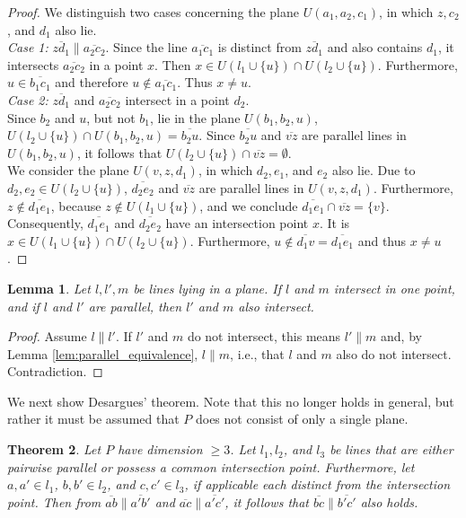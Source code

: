 \documentclass[11pt,a4paper]{article}
\newcommand{\lineab}[1]{\overline{#1}}
\newtheorem{theorem}{Theorem}[section]
\newtheorem{lemma}[theorem]{Lemma}
\begin{document}
\begin{proof}
We distinguish two cases concerning the plane $U(a_1, a_2, c_1)$, in which $z, c_2$, and $d_1$ also lie. \\
\textit{Case 1:} $\lineab{z d_1} \parallel \lineab{a_2 c_2}$. Since the line $\lineab{a_1 c_1}$ is distinct from $\lineab{z d_1}$ and also contains $d_1$, it intersects $\lineab{a_2 c_2}$ in a point $x$. Then $x \in U(l_1 \cup \{u\}) \cap U(l_2 \cup \{u\})$. Furthermore, $u \in \lineab{b_1 c_1}$ and therefore $u \notin \lineab{a_1 c_1}$. Thus $x \neq u$. \\
\textit{Case 2:} $\lineab{z d_1}$ and $\lineab{a_2 c_2}$ intersect in a point $d_2$. \\
Since $b_2$ and $u$, but not $b_1$, lie in the plane $U(b_1, b_2, u)$, $U(l_2 \cup \{u\}) \cap U(b_1, b_2, u) = \lineab{b_2 u}$. Since $\lineab{b_2 u}$ and $\lineab{v z}$ are parallel lines in $U(b_1, b_2, u)$, it follows that $U(l_2 \cup \{u\}) \cap \lineab{v z} = \emptyset$. \\
We consider the plane $U(v, z, d_1)$, in which $d_2, e_1$, and $e_2$ also lie. Due to $d_2, e_2 \in U(l_2 \cup \{u\})$, $\lineab{d_2 e_2}$ and $\lineab{v z}$ are parallel lines in $U(v, z, d_1)$. Furthermore, $z \notin \lineab{d_1 e_1}$, because $z \notin U(l_1 \cup \{u\})$, and we conclude $\lineab{d_1 e_1} \cap \lineab{v z} = \{v\}$. Consequently, $\lineab{d_1 e_1}$ and $\lineab{d_2 e_2}$ have an intersection point $x$. It is $x \in U(l_1 \cup \{u\}) \cap U(l_2 \cup \{u\})$. Furthermore, $u \notin \lineab{d_1 v} = \lineab{d_1 e_1}$ and thus $x \neq u$.
\end{proof}

\begin{lemma} \label{lem:parallel_intersection_transfer}
Let $l, l', m$ be lines lying in a plane. If $l$ and $m$ intersect in one point, and if $l$ and $l'$ are parallel, then $l'$ and $m$ also intersect.
\end{lemma}
\begin{proof}
Assume $l \parallel l'$. If $l'$ and $m$ do not intersect, this means $l' \parallel m$ and, by Lemma \ref{lem:parallel_equivalence}, $l \parallel m$, i.e., that $l$ and $m$ also do not intersect. Contradiction.
\end{proof}

We next show Desargues' theorem. Note that this no longer holds in general, but rather it must be assumed that $P$ does not consist of only a single plane.

\begin{theorem} \label{thm:desargues}
Let $P$ have dimension $\ge 3$. Let $l_1, l_2$, and $l_3$ be lines that are either pairwise parallel or possess a common intersection point. Furthermore, let $a, a' \in l_1$, $b, b' \in l_2$, and $c, c' \in l_3$, if applicable each distinct from the intersection point. Then from $\lineab{ab} \parallel \lineab{a'b'}$ and $\lineab{ac} \parallel \lineab{a'c'}$, it follows that $\lineab{bc} \parallel \lineab{b'c'}$ also holds.
\end{theorem}
\end{document}
